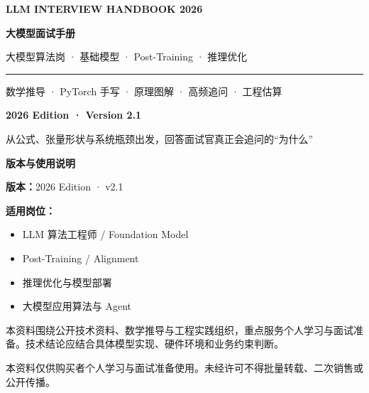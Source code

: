 \documentclass[UTF8,zihao=-4,openany,fontset=fandol]{ctexbook}
\begin{document}

\frontmatter
\begin{titlepage}
  \centering
  \vspace*{14mm}
  {\sffamily\bfseries\color{blue}\Large LLM INTERVIEW HANDBOOK 2026\par}
  \vspace{10mm}
  {\Huge\bfseries 大模型面试手册\par}
  \vspace{7mm}
  {\Large 大模型算法岗 · 基础模型 · Post-Training · 推理优化\par}
  \vspace{16mm}
  \rule{0.68\textwidth}{0.7pt}\par
  \vspace{8mm}
  {\large 数学推导 · PyTorch 手写 · 原理图解 · 高频追问 · 工程估算\par}
  \vfill
  {\sffamily\bfseries 2026 Edition · Version 2.1\par}
  \vspace{4mm}
  {\small 从公式、张量形状与系统瓶颈出发，回答面试官真正会追问的“为什么”\par}
\end{titlepage}

\clearpage
\thispagestyle{empty}
\vspace*{24mm}
{\Large\bfseries\sffamily 版本与使用说明\par}
\vspace{10mm}

\noindent\textbf{版本：}2026 Edition · v2.1

\vspace{6mm}
\noindent\textbf{适用岗位：}
\begin{itemize}
  \item LLM 算法工程师 / Foundation Model
  \item Post-Training / Alignment
  \item 推理优化与模型部署
  \item 大模型应用算法与 Agent
\end{itemize}

\vspace{8mm}
本资料围绕公开技术资料、数学推导与工程实践组织，重点服务个人学习与面试准备。技术结论应结合具体模型实现、硬件环境和业务约束判断。

\vfill
\begin{tcolorbox}[colback=codebg,colframe=linegray,title=版权说明]
本资料仅供购买者个人学习与面试准备使用。未经许可不得批量转载、二次销售或公开传播。
\end{tcolorbox}
\clearpage
\end{document}

